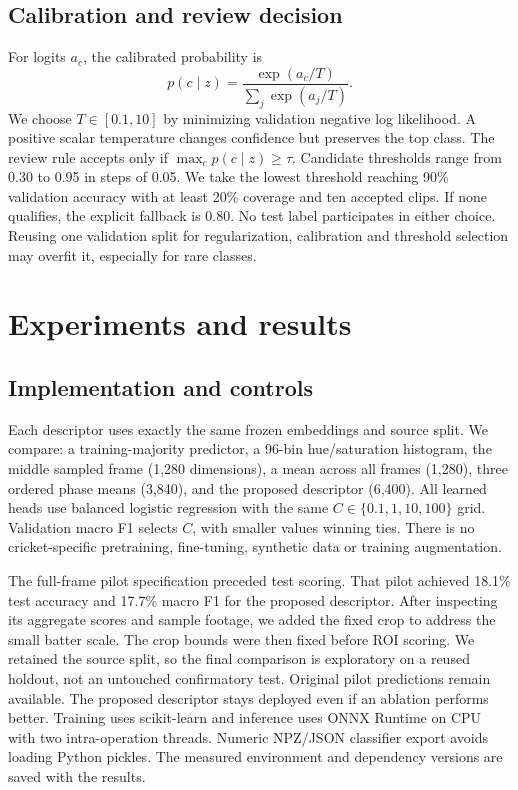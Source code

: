 \subsection{Calibration and review decision}
For logits $a_c$, the calibrated probability is
\begin{equation}
p(c\mid z)=\frac{\exp(a_c/T)}{\sum_j\exp(a_j/T)}.
\end{equation}
We choose $T\in[0.1,10]$ by minimizing validation negative log likelihood. A positive scalar temperature changes confidence but preserves the top class. The review rule accepts only if $\max_c p(c\mid z)\geq\tau$. Candidate thresholds range from 0.30 to 0.95 in steps of 0.05. We take the lowest threshold reaching 90\% validation accuracy with at least 20\% coverage and ten accepted clips. If none qualifies, the explicit fallback is 0.80. No test label participates in either choice. Reusing one validation split for regularization, calibration and threshold selection may overfit it, especially for rare classes.

\section{Experiments and results}
\subsection{Implementation and controls}
Each descriptor uses exactly the same frozen embeddings and source split. We compare: a training-majority predictor, a 96-bin hue/saturation histogram, the middle sampled frame (1,280 dimensions), a mean across all frames (1,280), three ordered phase means (3,840), and the proposed descriptor (6,400). All learned heads use balanced logistic regression with the same $C\in\{0.1,1,10,100\}$ grid. Validation macro F1 selects $C$, with smaller values winning ties. There is no cricket-specific pretraining, fine-tuning, synthetic data or training augmentation.

The full-frame pilot specification preceded test scoring. That pilot achieved 18.1\% test accuracy and 17.7\% macro F1 for the proposed descriptor. After inspecting its aggregate scores and sample footage, we added the fixed crop to address the small batter scale. The crop bounds were then fixed before ROI scoring. We retained the source split, so the final comparison is exploratory on a reused holdout, not an untouched confirmatory test. Original pilot predictions remain available. The proposed descriptor stays deployed even if an ablation performs better. Training uses scikit-learn and inference uses ONNX Runtime on CPU with two intra-operation threads. Numeric NPZ/JSON classifier export avoids loading Python pickles. The measured environment and dependency versions are saved with the results.

